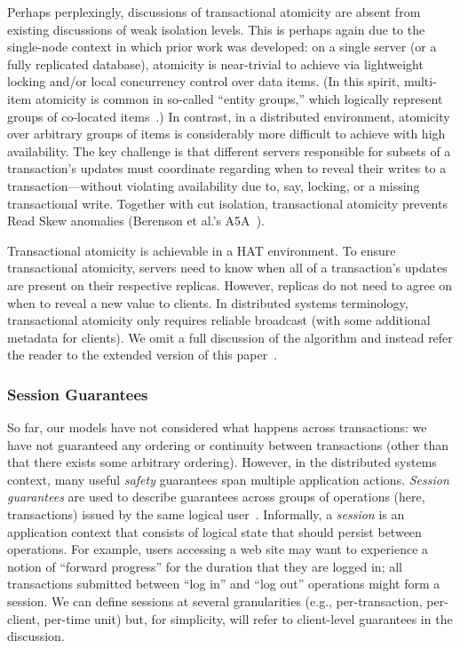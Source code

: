 Perhaps perplexingly, discussions of transactional atomicity are
absent from existing discussions of weak isolation levels. This is
perhaps again due to the single-node context in which prior work was
developed: on a single server (or a fully replicated database),
atomicity is near-trivial to achieve via lightweight locking and/or
local concurrency control over data items. (In this spirit, multi-item
atomicity is common in so-called ``entity groups,'' which logically
represent groups of co-located items~\cite{entitygroup}.) In contrast,
in a distributed environment, atomicity over arbitrary groups of items
is considerably more difficult to achieve with high availability. The
key challenge is that different servers responsible for subsets of a
transaction's updates must coordinate regarding when to reveal their
writes to a transaction---without violating availability due to, say,
locking, or a missing transactional write. Together with cut
isolation, transactional atomicity prevents Read Skew anomalies
(Berenson et al.'s A5A~\cite{ansicritique}).

Transactional atomicity is achievable in a HAT environment. To ensure
transactional atomicity, servers need to know when all of a
transaction's updates are present on their respective
replicas. However, replicas do not need to agree on when to reveal a
new value to clients. In distributed systems terminology,
transactional atomicity only requires reliable broadcast (with some
additional metadata for clients). We omit a full discussion of the
algorithm and instead refer the reader to the extended version of this
paper~\cite{hat-tr}.

\subsubsection{Session Guarantees}

So far, our models have not considered what happens across
transactions: we have not guaranteed any ordering or continuity
between transactions (other than that there exists some arbitrary
ordering). However, in the distributed systems context, many useful
\textit{safety} guarantees span multiple application actions.
\textit{Session guarantees} are used to describe guarantees across
groups of operations (here, transactions) issued by the same logical
user~\cite{sessionguarantees}. Informally, a \textit{session} is an
application context that consists of logical state that should persist
between operations. For example, users accessing a web site may want
to experience a notion of ``forward progress'' for the duration that
they are logged in; all transactions submitted between ``log in'' and
``log out'' operations might form a session. We can define sessions at
several granularities (e.g., per-transaction, per-client, per-time unit)
but, for simplicity, will refer to client-level guarantees in the
discussion.

